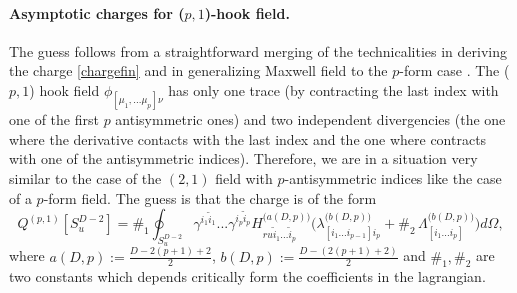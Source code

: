 \documentclass[a4paper,12pt]{article}
\begin{document}
\paragraph{Asymptotic charges for ($p,1$)-hook field.}
The guess follows from a straightforward merging of the technicalities in deriving the charge \eqref{chargefin} and in generalizing Maxwell field to the $p$-form case \cite{manz2,Esmaeili:2020eua, Afshar:2018apx, Manzoni:2024tow}. The ($p,1$) hook field $\phi_{[\mu_1,...\mu_{p}]\nu}$ has only one trace (by contracting the last index with one of the first $p$ antisymmetric ones) and two independent divergencies (the one where the derivative contacts with the last index and the one where contracts with one of the antisymmetric indices). Therefore, we are in a situation very similar to the case of the $(2,1)$ field with $p$-antisymmetric indices like the case of a $p$-form field. The guess is that the charge is of the form
\begin{equation}
    Q^{(p,1)}[S^{D-2}_u]= \#_1\oint_{S^{D-2}_u}\gamma^{i_1\tilde{i}_1}...\gamma^{i_{p}\tilde{i}_{p}}H^{\big(a(D,p)\big)}_{r u \tilde{i}_1 ... \tilde{i}_{p}}\bigg(\lambda^{\big(b(D,p)\big)}_{[{i}_1 ... {i}_{p-1}]i_p}+\#_2\,\Lambda^{\big(b(D,p)\big)}_{[{i}_1 ... {i}_{p}]}\bigg)d\Omega,
    \label{chargefingen}
\end{equation}
where $a(D,p):=\frac{D-2(p+1)+2}{2}$, $b(D,p):=\frac{D-(2(p+1)+2)}{2}$ and $\#_1,\#_2$ are two constants which depends critically form the coefficients in the lagrangian. 
\end{document}
